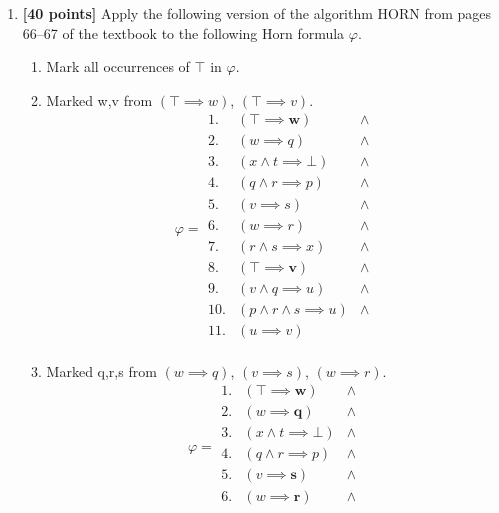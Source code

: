 \documentclass{article}
\begin{document}
\begin{enumerate}
\item \textbf{[40 points]} Apply the following version of the
  algorithm HORN from pages 66--67 of the textbook to the following
  Horn formula $\varphi$.
  \begin{enumerate}
  \item Mark all occurrences of $\top$ in $\varphi$.
  \item Marked w,v from $(\top \implies w)$, $(\top \implies v)$.
  \begin{displaymath}
    \varphi = 
    \begin{array}{|lll}
      1.  & (\top \implies \textbf{w})                  & \land \\
      2.  & (w \implies q)                     & \land \\
      3.  & (x \land t \implies \bot)          & \land \\
      4.  & (q \land r \implies p)             & \land \\
      5.  & (v \implies s)                     & \land \\
      6.  & (w \implies r)                     & \land \\
      7.  & (r \land s \implies x)             & \land \\
      8.  & (\top \implies \textbf{v})                  & \land \\
      9.  & (v \land q \implies u)             & \land \\
      10. & (p \land r \land s \implies u)     & \land \\
      11. & (u \implies v)                     &       \\
    \end{array}
  \end{displaymath}
  \item Marked q,r,s from $(w \implies q)$, $(v \implies s)$, $(w \implies r)$.
  \begin{displaymath}
    \varphi = 
    \begin{array}{|lll}
      1.  & (\top \implies \textbf{w})                  & \land \\
      2.  & (w \implies \textbf{q})                     & \land \\
      3.  & (x \land t \implies \bot)          & \land \\
      4.  & (q \land r \implies p)             & \land \\
      5.  & (v \implies \textbf{s})                     & \land \\
      6.  & (w \implies \textbf{r})                     & \land \\

\end{array}
\end{displaymath}
\end{enumerate}
\end{enumerate}
\end{document}
